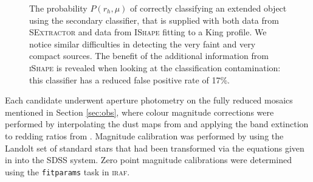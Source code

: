\documentclass[useAMS,usenatbib]{mn2e}
\begin{document}
\begin{figure}
\begin{minipage}[t]{.49\textwidth}
		\caption{The probability $P(r_h, \mu)$ of correctly classifying an extended object using the secondary classifier, that is supplied with both data from \textsc{SExtractor} and data from \textsc{IShape} fitting to a King profile. We notice similar difficulties in detecting the very faint and very compact sources. The benefit of the additional information from \textsc{iShape} is revealed when looking at the classification contamination: this classifier has a reduced false positive rate of 17\%.}
		\label{fig:comp2}
	\end{minipage}
\end{figure}

%
%



Each candidate underwent aperture photometry on the fully reduced mosaics mentioned in Section \ref{sec:obs}, where colour magnitude corrections were performed by interpolating the dust maps from \citet{Schlegel1998} and applying the band extinction to redding ratios from \citet{Schlafly2011}. Magnitude calibration was performed by using the Landolt set of standard stars \citep{Landolt1992} that had been transformed via the equations given in \citet{Fukugita1996} into the SDSS system. Zero point magnitude calibrations were determined using the \verb|fitparams| task in \textsc{iraf}.
\end{document}
